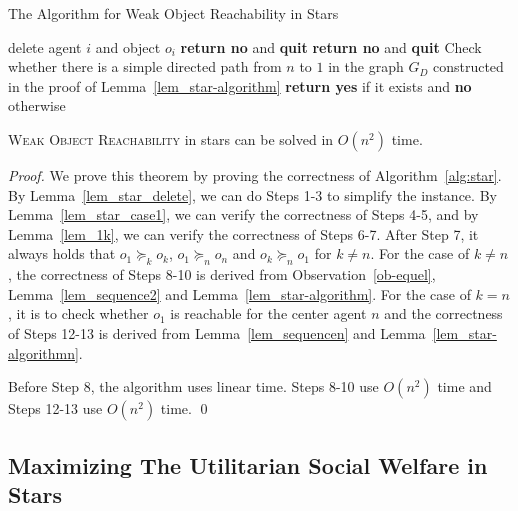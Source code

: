 \begin{algorithm}[h]
    \caption{The Algorithm for Weak Object Reachability in Stars}
    \label{alg:star}
    { {delete agent $i$ and object $o_i$\;} }
     {\textbf{return no} and \textbf{quit}\;}
     {\textbf{return no} and \textbf{quit}\;}
     {Check whether there is a simple directed path from $n$ to $1$ in the graph $G_D$ constructed in the proof of Lemma~\ref{lem_star-algorithm}\;
     \textbf{return yes} if it exists and \textbf{no} otherwise\;}
\end{algorithm}



\begin{theorem}
  \label{lem_wor}
  \textsc{Weak Object Reachability} in stars can be solved in $O(n^2)$ time.
\end{theorem}
\begin{proof}
We prove this theorem by proving the correctness of Algorithm~\ref{alg:star}. By Lemma~\ref{lem_star_delete}, we can do Steps 1-3 to simplify the instance.
By Lemma~\ref{lem_star_case1}, we can verify the correctness of Steps 4-5, and  by Lemma~\ref{lem_1k},
we can verify the correctness of Steps 6-7.
After Step 7, it always holds that $o_{1}\succeq_k o_k$, $o_1 \succeq_n o_{n}$ and $o_k \succeq_n o_{1}$ for $k\neq n$.
For the case of $k\neq n$, the correctness of Steps 8-10 is derived from Observation~\ref{ob-equel}, Lemma~\ref{lem_sequence2} and Lemma~\ref{lem_star-algorithm}.
For the case of $k= n$, it is to check whether $o_1$ is reachable for the center agent $n$ and the correctness of Steps 12-13 is derived from Lemma~\ref{lem_sequencen} and Lemma~\ref{lem_star-algorithmn}.

Before Step 8, the algorithm uses linear time. Steps 8-10 use $O(n^2)$ time and Steps 12-13 use $O(n^2)$ time.
\qed
\end{proof}

\subsection{Maximizing The Utilitarian Social Welfare in Stars}


